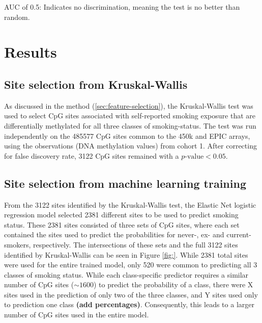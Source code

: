 \documentclass{article}
\begin{document}
AUC of 0.5:
Indicates no discrimination, meaning the test is no better than random.

\section{Results} \label{sec:results}

\subsection{Site selection from Kruskal-Wallis}
As discussed in the method (\ref{sec:feature-selection}), the Kruskal-Wallis test was used to select CpG sites associated with self-reported smoking exposure that are differentially methylated for all three classes of smoking-status. The test was run independently on the \num{485577} CpG sites common to the 450k and EPIC arrays, using the observations (DNA methylation values) from cohort 1. After correcting for false discovery rate, \num{3122} CpG sites remained with a \(p\text{-value} < 0.05\).


\subsection{Site selection from machine learning training}
From the \num{3122} sites identified by the Kruskal-Wallis test, the Elastic Net logistic regression model selected \num{2381} different sites to be used to predict smoking status. These \num{2381} sites consisted of three sets of CpG sites, where each set contained the sites used to predict the probabilities for never-, ex- and current-smokers, respectively.
The intersections of these sets and the full \num{3122} sites identified by Kruskal-Wallis can be seen in Figure \ref{fig:}. While \num{2381} total sites were used for the entire trained model, only \num{520} were common to predicting all 3 classes of smoking status. While each class-specific predictor requires a similar number of CpG sites (\(\sim\!1600\)) to predict the probability of a class, there were X sites used in the prediction of only two of the three classes, and Y sites used only to prediction one class \textbf{(add percentages)}. Consequently, this leads to a larger number of CpG sites used in the entire model.
\end{document}
